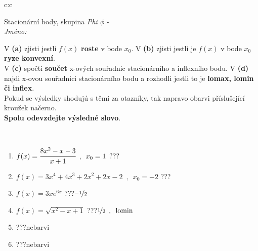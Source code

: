 \documentclass[10pt]{report}
\begin{document}
\newpage
\thispagestyle{empty}
\begin{tabular}{c:c}
\begin{minipage}[c][104.5mm][t]{0.5\linewidth}
\begin{center}
\vspace{7mm}
{\huge Stacionární body, skupina \textit{Phi $\phi$} -}\\[5mm]
\textit{Jméno:}\phantom{xxxxxxxxxxxxxxxxxxxxxxxxxxxxxxxxxxxxxxxxxxxxxxxxxxxxxxxxxxxxxxxxx}\\[5mm]
\begin{minipage}{0.95\linewidth}
\begin{center}
{\small V \textbf{(a)} zjisti jestli $f(x)$ \textbf{roste} v bode $x_0$. V \textbf{(b)} zjisti jestli je $f(x)$ v bode $x_0$ \textbf{ryze konvexní}.\\V \textbf{(c)} spočti \textbf{součet} x-ových souřadnic stacionárního a inflexního bodu. V \textbf{(d)} najdi x-ovou souřadnici stacionárního bodu a rozhodli jestli to je \textbf{lomax, lomin či inflex}.\\Pokud se výsledky shodujú s těmi za otazníky, tak napravo obarvi příslušející kroužek načerno.\\\textbf{Spolu odevzdejte výsledné slovo}}.
\end{center}
\end{minipage}
\\[1mm]
\begin{minipage}{0.79\linewidth}
\begin{center}
\begin{varwidth}{\linewidth}
\begin{enumerate}
\normalsize
\item $f(x)=\cfrac{8x^2-x-3}{x+1}\enspace , \enspace x_0=1$\quad \dotfill\; ???\;\dotfill \quad {}
\item $f(x)=3x^4+4x^3+2x^2+2x-2\enspace , \enspace x_0=-2$\quad \dotfill\; ???\;\dotfill \quad {}
\item $f(x)=3xe^{6x}$\quad \dotfill\; ???\;\dotfill \quad $\nicefrac{-1}{2}$
\item $f(x)=\sqrt{x^2-x+1}$\quad \dotfill\; ???\;\dotfill \quad $\nicefrac{1}{2}\enspace , \enspace \mathrm{lomin}$
\item \quad \dotfill\; ???\;\dotfill \quad nebarvi
\item \quad \dotfill\; ???\;\dotfill \quad nebarvi
\end{enumerate}
\end{varwidth}
\end{center}

\end{minipage}
\end{center}
\end{minipage}
\end{tabular}
\end{document}
